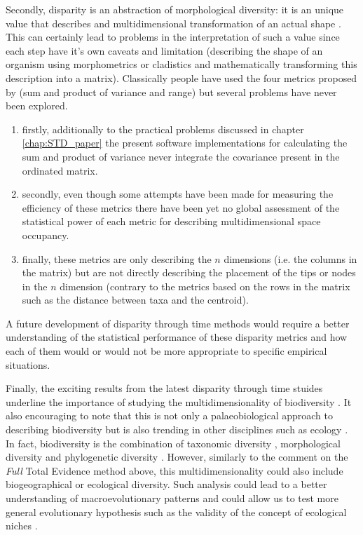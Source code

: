 Secondly, disparity is an abstraction of morphological diversity: it is an unique value that describes and multidimensional transformation of an actual shape \citep{Wills1994,foote1997evolution}.
This can certainly lead to problems in the interpretation of such a value since each step have it's own caveats and limitation (describing the shape of an organism using morphometrics or cladistics and mathematically transforming this description into a matrix).
Classically people have used the four metrics proposed by \cite{Wills1994} (sum and product of variance and range) but several problems have never been explored.
\begin{enumerate}
\item firstly, additionally to the practical problems discussed in chapter \ref{chap:STD_paper} the present software implementations for calculating the sum and product of variance never integrate the covariance present in the ordinated matrix.
\item secondly, even though some attempts have been made for measuring the efficiency of these metrics \citep{Ciampaglio2001} there have been yet no global assessment of the statistical power of each metric for describing multidimensional space occupancy.
\item finally, these metrics are only describing the $n$ dimensions (i.e. the columns in the matrix) but are not directly describing the placement of the tips or nodes in the $n$ dimension (contrary to the metrics based on the rows in the matrix such as the distance between taxa and the centroid).
\end{enumerate}
A future development of disparity through time methods would require a better understanding of the statistical performance of these disparity metrics and how each of them would or would not be more appropriate to specific empirical situations.

Finally, the exciting results from the latest disparity through time stuides underline the importance of studying the multidimensionality of biodiversity \citep[cf. just taxonomic richness;][]{Butler2012,brusattedinosaur2012,toljagictriassic-jurassic2013,brusattegradual2014,bensonfaunal2014,Claddis,Close2015}.
It also encouraging to note that this is not only a palaeobiological approach to describing biodiversity but is also trending in other disciplines such as ecology \citep{DonohueDim}.
In fact, biodiversity is the combination of taxonomic diversity \citep[e.g.][]{Stadler12042011}, morphological diversity \citep[from cladistics or morphometrics;][]{hetherington2015cladistic} and phylogenetic diversity \citep[e.g. the evolutionary rates regimes;][]{Close2015}.
However, similarly to the comment on the \textit{Full} Total Evidence method above, this multidimensionality could also include biogeographical or ecological diversity.
Such analysis could lead to a better understanding of macroevolutionary patterns and could allow us to test more general evolutionary hypothesis such as the validity of the concept of ecological niches \citep{pearmanniche2008}.

